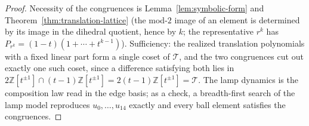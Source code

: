 \documentclass[11pt,a4paper]{article}
\theoremstyle{remark}
\theoremstyle{plain}
\begin{document}
\begin{proof}
Necessity of the congruences is Lemma~\ref{lem:symbolic-form} and
Theorem~\ref{thm:translation-lattice} (the mod-$2$ image of an element
is determined by its image in the dihedral quotient, hence by $k$; the
representative $r^k$ has $P_{r^k} = (1-t)(1 + \cdots + t^{k-1})$).
Sufficiency: the realized translation polynomials with a fixed linear
part form a single coset of $\mathcal{T}$, and the two congruences cut
out exactly one such coset, since a difference satisfying both lies in
$2\mathbb{Z}[t^{\pm 1}] \cap (t-1)\mathbb{Z}[t^{\pm 1}] =
2(t-1)\mathbb{Z}[t^{\pm 1}] = \mathcal{T}$.  The lamp dynamics is the
composition law read in the edge basis; as a check, a breadth-first
search of the lamp model reproduces $u_0, \ldots, u_{14}$ exactly and
every ball element satisfies the congruences.
\end{proof}
\end{document}
